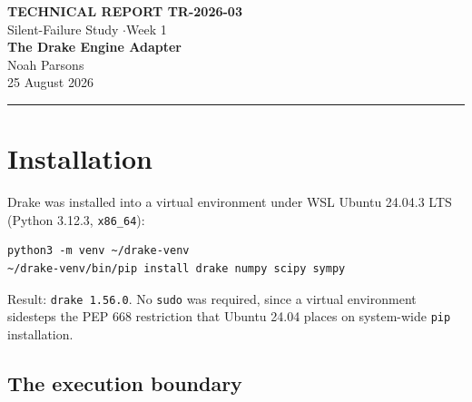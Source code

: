 \documentclass[11pt,a4paper]{article}
\begin{document}
\begin{center}
{\footnotesize\bfseries TECHNICAL REPORT TR-2026-03}\\[0.3em]
{\footnotesize Silent-Failure Study \quad$\cdot$\quad Week 1}\\[1.0em]
{\LARGE\bfseries The Drake Engine Adapter}\\[0.7em]
{\large Noah Parsons}\\[0.3em]
{\small 25 August 2026}
\end{center}

\vspace{0.8em}
\hrule
\vspace{1.2em}

\begin{abstract}
\noindent
This report documents the third and final engine column: Drake 1.56.0, driven
through \texttt{MultibodyPlant}. It records the installation, the modelling of
the $N$-link chain as a rigid-body mechanism, and validation against the
library-independent reference, which Drake matches to $7.2\times10^{-14}$ across
$N = 1\ldots5$. All three engines now agree. Two findings are recorded: a
coordinate-convention error of the same class as the one in TR-2026-01, caught
by the same diagnostic; and the conclusion that only one of the three
nominally portable axes transcribes directly into a rigid-body engine, which is
a scope question the study must settle before Week 2.
\end{abstract}

\section{Installation}

Drake was installed into a virtual environment under WSL Ubuntu 24.04.3 LTS
(Python 3.12.3, \texttt{x86\_64}):

\begin{lstlisting}
python3 -m venv ~/drake-venv
~/drake-venv/bin/pip install drake numpy scipy sympy
\end{lstlisting}

\noindent Result: \texttt{drake 1.56.0}. No \texttt{sudo} was required, since a
virtual environment sidesteps the PEP 668 restriction that Ubuntu 24.04 places
on system-wide \texttt{pip} installation.

\subsection{The execution boundary}
\end{document}
